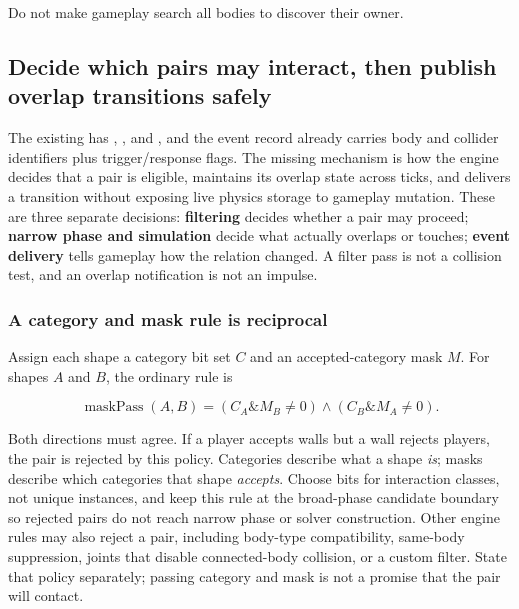 Do not make gameplay search all bodies to discover their owner.

\subsection{Decide which pairs may interact, then publish overlap transitions safely}\label{05-engine-i-ch017-decide-which-pairs-may-interact-then-publish-overlap-transitions-safely}

\hypertarget{05-engine-i-ch017-decide-which-pairs-may-interact-then-publish-overlap-transitions-safely}{}

The existing  has , , and , and the event record already carries body and collider identifiers plus trigger/response flags. The missing mechanism is how the engine decides that a pair is eligible, maintains its overlap state across ticks, and delivers a transition without exposing live physics storage to gameplay mutation. These are three separate decisions: \textbf{filtering} decides whether a pair may proceed; \textbf{narrow phase and simulation} decide what actually overlaps or touches; \textbf{event delivery} tells gameplay how the relation changed. A filter pass is not a collision test, and an overlap notification is not an impulse.

\subsubsection{A category and mask rule is reciprocal}\label{05-engine-i-ch017-a-category-and-mask-rule-is-reciprocal}

\hypertarget{05-engine-i-ch017-a-category-and-mask-rule-is-reciprocal}{}

Assign each shape a category bit set \(C\) and an accepted-category mask \(M\). For shapes \(A\) and \(B\), the ordinary rule is

\[
\operatorname{maskPass}(A,B) = (C_A \mathbin{\&} M_B \ne 0) \land (C_B \mathbin{\&} M_A \ne 0).
\]

Both directions must agree. If a player accepts walls but a wall rejects players, the pair is rejected by this policy. Categories describe what a shape \emph{is}; masks describe which categories that shape \emph{accepts}. Choose bits for interaction classes, not unique instances, and keep this rule at the broad-phase candidate boundary so rejected pairs do not reach narrow phase or solver construction. Other engine rules may also reject a pair, including body-type compatibility, same-body suppression, joints that disable connected-body collision, or a custom filter. State that policy separately; passing category and mask is not a promise that the pair will contact.

